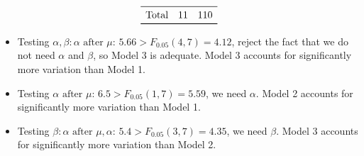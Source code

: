 \begin{Example}{}{}
\[\begin{array}{lllll}
            \midrule
            \text{Total}                                        & 11                        & 110                                              \\
            \bottomrule
        \end{array} \]
    \begin{itemize}
        \item Testing $ \alpha,\beta:\alpha\text{ after }\mu $: $ 5.66>F_{0.05}(4,7)=4.12 $, reject the fact
              that we do not need $ \alpha $ and $ \beta $, so Model 3 is adequate. Model 3
              accounts for significantly more variation than Model 1.
        \item Testing $ \alpha\text{ after }\mu $: $ 6.5>F_{0.05}(1,7)=5.59 $, we need $ \alpha $.
              Model 2 accounts for significantly more variation than Model 1.
        \item Testing $ \beta:\alpha\text{ after }\mu,\alpha $: $ 5.4>F_{0.05}(3,7)=4.35 $, we need $ \beta $.
              Model 3 accounts for significantly more variation than Model 2.
    \end{itemize}
\end{Example}
